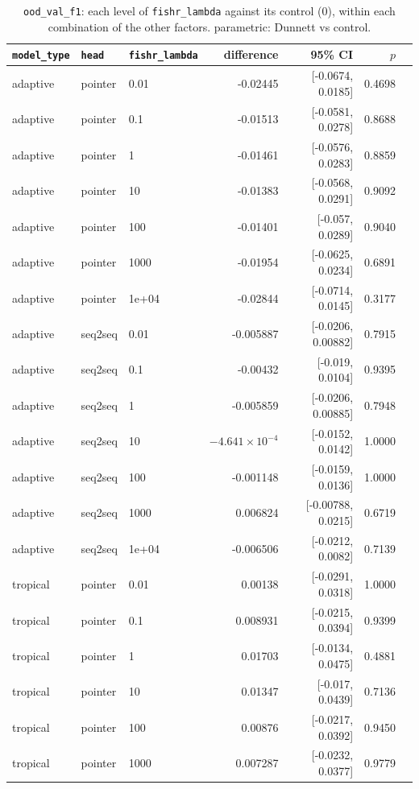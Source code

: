 \documentclass[10pt]{article}
\begin{document}
{\small
\begin{longtable}{lllrrrl}
\caption{\texttt{ood\_val\_f1}: each level of \texttt{fishr\_lambda} against its control (0), within each combination of the other factors. parametric: Dunnett vs control.}\label{tab:control-ood_val_f1}\\
\toprule
\texttt{model\_type} & \texttt{head} & \texttt{fishr\_lambda} & difference & 95\% CI & $p$ & \\
\midrule
\endhead
adaptive & pointer & 0.01 & -0.02445 & [-0.0674, 0.0185] & 0.4698 & \\
adaptive & pointer & 0.1 & -0.01513 & [-0.0581, 0.0278] & 0.8688 & \\
adaptive & pointer & 1 & -0.01461 & [-0.0576, 0.0283] & 0.8859 & \\
adaptive & pointer & 10 & -0.01383 & [-0.0568, 0.0291] & 0.9092 & \\
adaptive & pointer & 100 & -0.01401 & [-0.057, 0.0289] & 0.9040 & \\
adaptive & pointer & 1000 & -0.01954 & [-0.0625, 0.0234] & 0.6891 & \\
adaptive & pointer & 1e+04 & -0.02844 & [-0.0714, 0.0145] & 0.3177 & \\
adaptive & seq2seq & 0.01 & -0.005887 & [-0.0206, 0.00882] & 0.7915 & \\
adaptive & seq2seq & 0.1 & -0.00432 & [-0.019, 0.0104] & 0.9395 & \\
adaptive & seq2seq & 1 & -0.005859 & [-0.0206, 0.00885] & 0.7948 & \\
adaptive & seq2seq & 10 & $-4.641\times10^{-4}$ & [-0.0152, 0.0142] & 1.0000 & \\
adaptive & seq2seq & 100 & -0.001148 & [-0.0159, 0.0136] & 1.0000 & \\
adaptive & seq2seq & 1000 & 0.006824 & [-0.00788, 0.0215] & 0.6719 & \\
adaptive & seq2seq & 1e+04 & -0.006506 & [-0.0212, 0.0082] & 0.7139 & \\
tropical & pointer & 0.01 & 0.00138 & [-0.0291, 0.0318] & 1.0000 & \\
tropical & pointer & 0.1 & 0.008931 & [-0.0215, 0.0394] & 0.9399 & \\
tropical & pointer & 1 & 0.01703 & [-0.0134, 0.0475] & 0.4881 & \\
tropical & pointer & 10 & 0.01347 & [-0.017, 0.0439] & 0.7136 & \\
tropical & pointer & 100 & 0.00876 & [-0.0217, 0.0392] & 0.9450 & \\
tropical & pointer & 1000 & 0.007287 & [-0.0232, 0.0377] & 0.9779 & \\

\end{longtable}}
\end{document}
